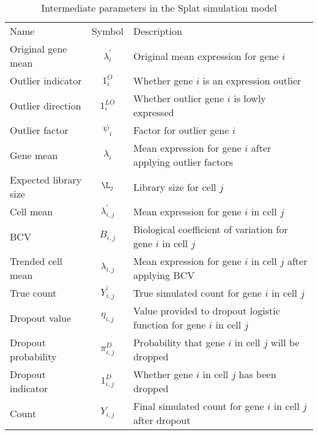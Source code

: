 \begin{table} 
    \begin{tabular}{ l c l }
        Name & Symbol & Description \\
        Original gene mean & $\lambda^{'}_i$ & Original mean expression for gene $i$ \\
        Outlier indicator & $1^{O}_i$ & Whether gene $i$ is an expression outlier \\ 
        Outlier direction & $1^{LO}_i$ & Whether outlier gene $i$ is lowly expressed \\
        Outlier factor & $\psi_i$ & Factor for outlier gene $i$ \\
        Gene mean & $\lambda_i$ & Mean expression for gene $i$ after applying outlier factors \\
        Expected library size & $\L_j$ & Library size for cell $j$ \\
        Cell mean & $\lambda^{'}_{i,j}$ & Mean expression for gene $i$ in cell $j$ \\
        BCV & $B_{i,j}$ & Biological coefficient of variation for gene $i$ in cell $j$ \\
        Trended cell mean & $\lambda_{i,j}$ & Mean expression for gene $i$ in cell $j$ after applying BCV \\
        True count & $Y^{'}_{i,j}$ & True simulated count for gene $i$ in cell $j$ \\
        Dropout value & $\eta_{i,j}$ & Value provided to dropout logistic function for gene $i$ in cell $j$\\
        Dropout probability & $\pi^{D}_{i,j}$ & Probability that gene $i$ in cell $j$ will be dropped \\
        Dropout indicator & $1^{D}_{i,j}$ & Whether gene $i$ in cell $j$ has been dropped \\
        Count & $Y_{i,j}$ & Final simulated count for gene $i$ in cell $j$ after dropout \\
    \end{tabular} 
    \caption{Intermediate parameters in the Splat simulation model} 
\end{table}